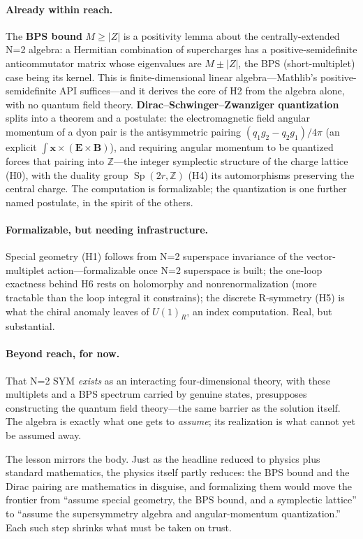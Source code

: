 \documentclass[11pt]{article}
\newcommand{\Z}{\mathbb{Z}}
\newcommand{\Sp}{\operatorname{Sp}}
\begin{document}
\paragraph{Already within reach.} The \textbf{BPS bound} $M \ge |Z|$ is a positivity lemma about the
centrally-extended N=2 algebra: a Hermitian combination of supercharges has a positive-semidefinite
anticommutator matrix whose eigenvalues are $M \pm |Z|$, the BPS (short-multiplet) case being its
kernel. This is finite-dimensional linear algebra---Mathlib's positive-semidefinite API
suffices---and it derives the core of H2 from the algebra alone, with no quantum field theory.
\textbf{Dirac--Schwinger--Zwanziger quantization} splits into a theorem and a postulate: the
electromagnetic field angular momentum of a dyon pair is the antisymmetric pairing
$(q_1 g_2 - q_2 g_1)/4\pi$ (an explicit $\int \mathbf{x}\times(\mathbf{E}\times\mathbf{B})$), and
requiring angular momentum to be quantized forces that pairing into $\Z$---the integer symplectic
structure of the charge lattice (H0), with the duality group $\Sp(2r,\Z)$ (H4) its automorphisms
preserving the central charge. The computation is formalizable; the quantization is one further
named postulate, in the spirit of the others.

\paragraph{Formalizable, but needing infrastructure.} Special geometry (H1) follows from N=2
superspace invariance of the vector-multiplet action---formalizable once N=2 superspace is built;
the one-loop exactness behind H6 rests on holomorphy and nonrenormalization (more tractable than the
loop integral it constrains); the discrete R-symmetry (H5) is what the chiral anomaly leaves of
$U(1)_R$, an index computation. Real, but substantial.

\paragraph{Beyond reach, for now.} That N=2 SYM \emph{exists} as an interacting four-dimensional
theory, with these multiplets and a BPS spectrum carried by genuine states, presupposes constructing
the quantum field theory---the same barrier as the solution itself. The algebra is exactly what one
gets to \emph{assume}; its realization is what cannot yet be assumed away.

\medskip
The lesson mirrors the body. Just as the headline reduced to physics plus standard mathematics, the
physics itself partly reduces: the BPS bound and the Dirac pairing are mathematics in disguise, and
formalizing them would move the frontier from ``assume special geometry, the BPS bound, and a
symplectic lattice'' to ``assume the supersymmetry algebra and angular-momentum quantization.'' Each
such step shrinks what must be taken on trust.
\end{document}

